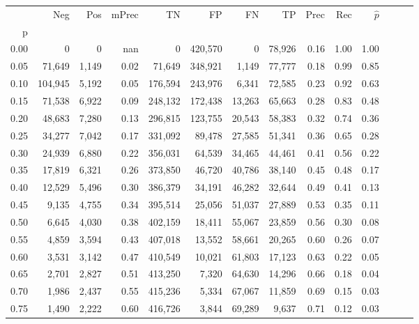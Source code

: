\begin{tabular}{rrrrrrrrrrrrrr}
\toprule
{} &      Neg &    Pos & mPrec &       TN &       FP &      FN &      TP &  Prec &   Rec & $\hat{p}$ \\
p    &          &        &       &          &          &         &         &       &       &           \\
\midrule
0.00 &        0 &      0 &   nan &        0 &  420,570 &       0 &  78,926 &  0.16 &  1.00 &      1.00 \\
0.05 &   71,649 &  1,149 &  0.02 &   71,649 &  348,921 &   1,149 &  77,777 &  0.18 &  0.99 &      0.85 \\
0.10 &  104,945 &  5,192 &  0.05 &  176,594 &  243,976 &   6,341 &  72,585 &  0.23 &  0.92 &      0.63 \\
0.15 &   71,538 &  6,922 &  0.09 &  248,132 &  172,438 &  13,263 &  65,663 &  0.28 &  0.83 &      0.48 \\
0.20 &   48,683 &  7,280 &  0.13 &  296,815 &  123,755 &  20,543 &  58,383 &  0.32 &  0.74 &      0.36 \\
0.25 &   34,277 &  7,042 &  0.17 &  331,092 &   89,478 &  27,585 &  51,341 &  0.36 &  0.65 &      0.28 \\
0.30 &   24,939 &  6,880 &  0.22 &  356,031 &   64,539 &  34,465 &  44,461 &  0.41 &  0.56 &      0.22 \\
0.35 &   17,819 &  6,321 &  0.26 &  373,850 &   46,720 &  40,786 &  38,140 &  0.45 &  0.48 &      0.17 \\
0.40 &   12,529 &  5,496 &  0.30 &  386,379 &   34,191 &  46,282 &  32,644 &  0.49 &  0.41 &      0.13 \\
0.45 &    9,135 &  4,755 &  0.34 &  395,514 &   25,056 &  51,037 &  27,889 &  0.53 &  0.35 &      0.11 \\
0.50 &    6,645 &  4,030 &  0.38 &  402,159 &   18,411 &  55,067 &  23,859 &  0.56 &  0.30 &      0.08 \\
0.55 &    4,859 &  3,594 &  0.43 &  407,018 &   13,552 &  58,661 &  20,265 &  0.60 &  0.26 &      0.07 \\
0.60 &    3,531 &  3,142 &  0.47 &  410,549 &   10,021 &  61,803 &  17,123 &  0.63 &  0.22 &      0.05 \\
0.65 &    2,701 &  2,827 &  0.51 &  413,250 &    7,320 &  64,630 &  14,296 &  0.66 &  0.18 &      0.04 \\
0.70 &    1,986 &  2,437 &  0.55 &  415,236 &    5,334 &  67,067 &  11,859 &  0.69 &  0.15 &      0.03 \\
0.75 &    1,490 &  2,222 &  0.60 &  416,726 &    3,844 &  69,289 &   9,637 &  0.71 &  0.12 &      0.03 \\

\end{tabular}
